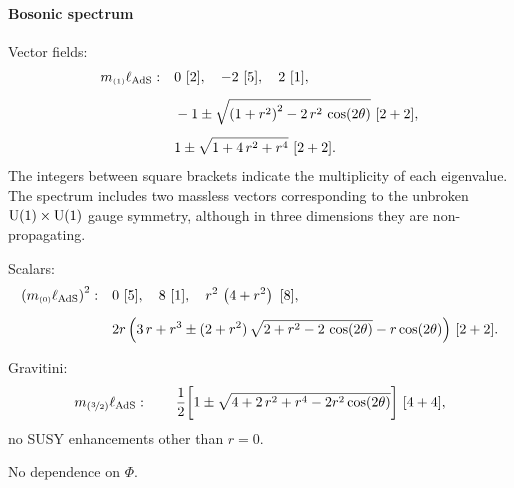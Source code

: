 \documentclass[11pt]{article}
\def\sst#1{{\scriptscriptstyle #1}}
\def\sst#1{{\scriptscriptstyle #1}}
\begin{document}
\paragraph{Bosonic spectrum}
Vector fields:
\begin{equation}
	\begin{aligned}	
		m_{\sst{(1)}}\ell_{\rm AdS}:\quad &
		0\ [2],	\quad
		-2\ [5],	\quad
		2\ [1],	\\[5pt]
		&	-1\pm\sqrt{\left(1+r^2\right)^2-2\,r^2\,\cos(2\theta)}\ [2+2],	\\[5pt]
		&	1\pm\sqrt{1+4\,r^2+r^{4}}\ [2+2].
	\end{aligned}
\end{equation}
The integers between square brackets indicate the multiplicity of each eigenvalue. The spectrum includes two massless vectors corresponding to the unbroken ${\rm U}(1)\times {\rm U}(1)$ gauge symmetry, although in three dimensions they are non-propagating.


Scalars:
\begin{equation}
	\begin{aligned}	
		\left(m_{\sst{(0)}}\ell_{\rm AdS}\right)^2:\quad&
		0\ [5],	\quad
		8\ [1],	\quad
		r^{2}\,\left(4+r^2\right)\ [8],	\\[5pt]
		&	2r\,\Big(3\,r+r^{3}\pm(2+r^{2})\,\sqrt{2+r^2-2\,\cos(2\theta)}-r\cos(2\theta)\Big)\ [2+2].
	\end{aligned}
\end{equation}

Gravitini:
\begin{equation}
	m_{{(\nicefrac32)}}\ell_{\rm AdS}:\quad 
	\quad \dfrac1{2}\bigg[1\pm\sqrt{4+2\,r^{2}+r^{4}-2r^{2}\cos(2\theta)}\bigg]\ [4+4],
\end{equation}
no SUSY enhancements other than $r=0$.

No dependence on $\Phi$.


\end{document}
